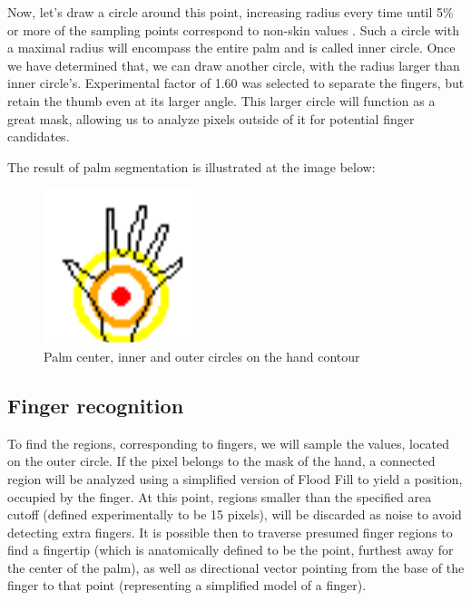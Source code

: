 \documentclass[a4paper,11pt,oneside]{article}
\begin{document}
Now, let's draw a circle around this point, increasing radius every time until 5\% or more of the sampling points correspond to non-skin values . Such a circle with a maximal radius will encompass the entire palm and is called inner circle. Once we have determined that, we can draw another circle, with the radius larger than inner circle's. Experimental factor of 1.60 was selected to separate the fingers, but retain the thumb even at its larger angle. This larger circle will function as a great mask, allowing us to analyze pixels outside of it for potential finger candidates.

The result of palm segmentation is illustrated at the image below:\\

\begin{figure}[H]
\centering
\includegraphics[scale=1.5]{hand-circles.png}
\caption{Palm center, inner and outer circles on the hand contour}
\end{figure}


\subsection{Finger recognition}

To find the regions, corresponding to fingers, we will sample the values, located on the outer circle. If the pixel belongs to the mask of the hand, a connected region will be analyzed using a simplified version of Flood Fill to yield a position, occupied by the finger. At this point, regions smaller than the specified area cutoff (defined experimentally to be 15 pixels), will be discarded as noise to avoid detecting extra fingers. It is possible then to traverse presumed finger regions to find a fingertip (which is anatomically defined to be the point, furthest away for the center of the palm), as well as directional vector pointing from the base of the finger to that point (representing a simplified model of a finger).\\
\end{document}
